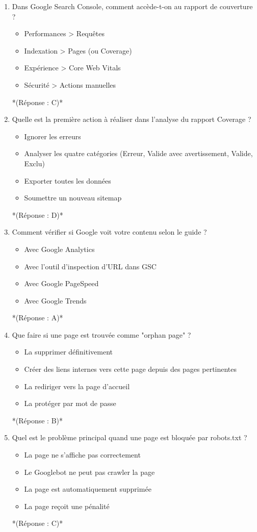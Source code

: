 \documentclass[12pt,a4paper,twoside]{report}
\begin{document}
\begin{enumerate}
\item Dans Google Search Console, comment accède-t-on au rapport de couverture ?
\begin{itemize}
\item[A)] Performances > Requêtes
\item[B)] Indexation > Pages (ou Coverage)
\item[C)] Expérience > Core Web Vitals
\item[D)] Sécurité > Actions manuelles
\end{itemize}
*(Réponse : C)*

\item Quelle est la première action à réaliser dans l'analyse du rapport Coverage ?
\begin{itemize}
\item[A)] Ignorer les erreurs
\item[B)] Analyser les quatre catégories (Erreur, Valide avec avertissement, Valide, Exclu)
\item[C)] Exporter toutes les données
\item[D)] Soumettre un nouveau sitemap
\end{itemize}
*(Réponse : D)*

\item Comment vérifier si Google voit votre contenu selon le guide ?
\begin{itemize}
\item[A)] Avec Google Analytics
\item[B)] Avec l'outil d'inspection d'URL dans GSC
\item[C)] Avec Google PageSpeed
\item[D)] Avec Google Trends
\end{itemize}
*(Réponse : A)*

\item Que faire si une page est trouvée comme "orphan page" ?
\begin{itemize}
\item[A)] La supprimer définitivement
\item[B)] Créer des liens internes vers cette page depuis des pages pertinentes
\item[C)] La rediriger vers la page d'accueil
\item[D)] La protéger par mot de passe
\end{itemize}
*(Réponse : B)*

\item Quel est le problème principal quand une page est bloquée par robots.txt ?
\begin{itemize}
\item[A)] La page ne s'affiche pas correctement
\item[B)] Le Googlebot ne peut pas crawler la page
\item[C)] La page est automatiquement supprimée
\item[D)] La page reçoit une pénalité
\end{itemize}
*(Réponse : C)*


\end{enumerate}
\end{document}
